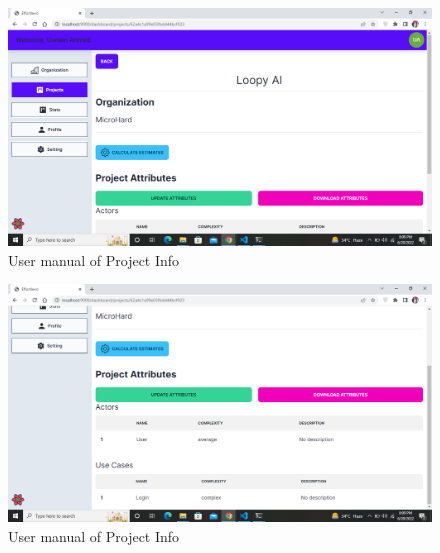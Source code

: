 \begin{figure}[H]
    \centering
    \includegraphics[scale=0.4]{./diagrams/user-manual/Screenshot (30).png}
    \caption{User manual of Project Info}
    \label{fig:user-1}

\end{figure}

\begin{figure}[H]
    \centering
    \includegraphics[scale=0.4]{./diagrams/user-manual/Screenshot (31).png}
    \caption{User manual of Project Info}
    \label{fig:user-1}

\end{figure}

